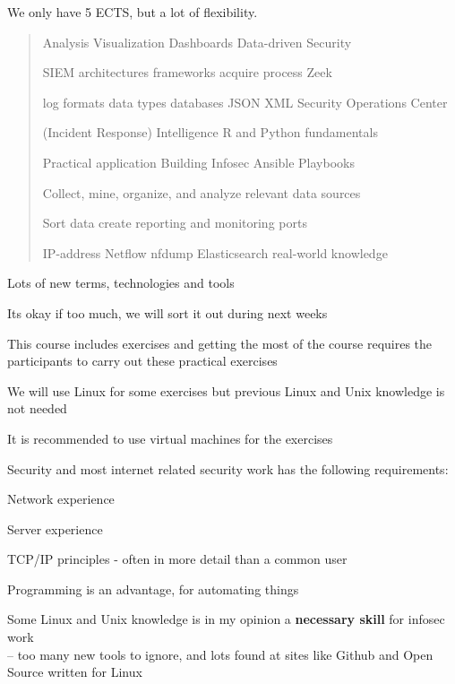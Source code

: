 \documentclass[Screen16to9,17pt]{foils}
\begin{document}
We only have 5 ECTS, but a lot of flexibility.




\begin{quote}\large
Analysis Visualization Dashboards Data-driven Security

SIEM architectures frameworks acquire process Zeek

log formats data types databases JSON XML Security Operations Center

(Incident Response) Intelligence R and Python fundamentals

Practical application Building Infosec \hskip 1cm Ansible Playbooks

Collect, mine, organize, and analyze relevant data sources

Sort data create reporting and monitoring ports

IP-address Netflow nfdump Elasticsearch real-world knowledge
\end{quote}

\begin{list2}
\item Lots of new terms, technologies and tools
\item Its okay if too much, we will sort it out during next weeks
\end{list2}



\begin{list1}
\item This course includes exercises and getting the most of the course requires the participants to carry out these practical exercises
\item We will use Linux for some exercises but previous Linux and Unix knowledge is not needed
\item It is recommended to use virtual machines for the exercises
\item Security and most internet related security work has the following requirements:
\begin{list2}
\item Network experience
\item Server experience
\item TCP/IP principles - often in more detail than a common user
\item Programming is an advantage, for automating things
\item Some Linux and Unix knowledge is in my opinion a {\bf necessary skill} for infosec work\\
-- too many new tools to ignore, and lots found at sites like Github and Open Source written for Linux
\end{list2}
\end{list1}
\end{document}
